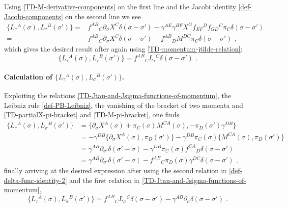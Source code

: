 \documentclass[12pt]{article}
\numberwithin{equation}{section}
\begin{document}
Using \eqref{TD-M-derivative-components} on the first line and the Jacobi identity \eqref{def-Jacobi-components} on the second line we see
\begin{equation}
\begin{aligned}
\{ L_{\tau}{}^{A}(\sigma),L_{\tau}{}^{B}(\sigma') \} =&f^{AB}{}_{C}\partial_{\sigma}X^{C}\delta(\sigma-\sigma')-\gamma^{AE}\gamma^{BF}X^{G}f_{EF}{}^{D}f_{GD}{}^{C}\pi_{C}\delta(\sigma-\sigma')
\\
=&f^{AB}{}_{C}\partial_{\sigma}X^{C}\delta(\sigma-\sigma')-f^{AB}{}_{D}M^{DC}\pi_{C}\delta(\sigma-\sigma') \,\, ,
\end{aligned}
\end{equation}
which gives the desired result after again using \eqref{TD-momentum-jtilde-relation}:
\begin{equation}
\{ L_{\tau}{}^{A}(\sigma),L_{\tau}{}^{B}(\sigma') \} = f^{AB}{}_{C}L_{\tau}{}^{C}\delta(\sigma-\sigma') \,\, .
\end{equation}


\paragraph{Calculation of $\{ L_{\tau}{}^{A}(\sigma),L_{\sigma}{}^{B}(\sigma') \}$.} Exploiting the relations \eqref{TD-Jtau-and-Jsigma-functions-of-momentum}, the Leibniz rule \eqref{def-PB-Leibniz}, the vanishing of the bracket of two momenta and \eqref{TD-partialX-pi-bracket} and \eqref{TD-M-pi-bracket}, one finds
\begin{equation}
\begin{aligned}
\{ L_{\tau}{}^{A}(\sigma),L_{\sigma}{}^{B}(\sigma') \} &= \{\partial_{\sigma}X^{A}(\sigma)+\pi_{C}(\sigma)M^{CA}(\sigma) ,-\pi_{D}(\sigma')\gamma^{DB} \}
\\
&=-\gamma^{DB} \{\partial_{\sigma}X^{A}(\sigma),\pi_{D}(\sigma')\}-\gamma^{DB}\pi_{C}(\sigma) \{M^{CA}(\sigma),\pi_{D}(\sigma')\}
\\
&=\gamma^{AB}\partial_{\sigma'}\delta(\sigma'-\sigma)-\gamma^{DB}\pi_{C}(\sigma)f^{CA}{}_{D}\delta(\sigma-\sigma') 
\\
&=\gamma^{AB}\partial_{\sigma'}\delta(\sigma'-\sigma)-f^{AB}{}_{C}\pi_{D}(\sigma)\gamma^{DC}\delta(\sigma-\sigma') \,\, ,
\end{aligned}
\end{equation}
finally arriving at the desired expression after using the second relation in \eqref{def-delta-func-identity-2} and the first relation in \eqref{TD-Jtau-and-Jsigma-functions-of-momentum},
\begin{equation}\label{TD-jtildetau-jtildesigma-bracket}
\{ L_{\tau}{}^{A}(\sigma),L_{\sigma}{}^{B}(\sigma') \}=f^{AB}{}_{C}L_{\sigma}{}^{C}\delta(\sigma-\sigma')-\gamma^{AB}\partial_{\sigma}\delta(\sigma-\sigma') \,\, .
\end{equation}
\end{document}
